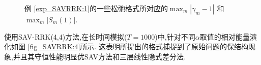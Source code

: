 \begin{figure}[H]
	\begin{center}
	\caption{例 \ref{exp_SAVRRK:1}的一些松弛格式所对应的$\max_m\left|\gamma_m-1\right|$ 和 $\max_m\left|S_m(1)\right|$.}
	\label{fig_SAVRRK:1}
	\end{center}
	\end{figure}
	使用SAV-RRK(4,4)方法,在长时间模拟($T=1000$)中,针对不同$\alpha$取值的相对能量演化如图 \ref{fig_SAVRRK:4}所示.
	这表明所提出的格式捕捉到了原始问题的保结构现象,并且其守恒性能明显优SAV方法\cite{chengConvergenceEnergyconservingScheme2022}和三层线性隐式差分法\cite{wangConservativeLinearizedDifference2015}.
